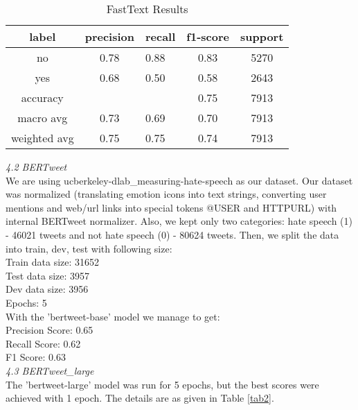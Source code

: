 \documentclass[a4paper, 10pt, conference]{IEEEtran}
\begin{document}
{{{\begin{table}[h!]
\centering
  \caption{FastText Results}
  \label{tab1}
  \setlength{\tabcolsep}{6pt} %
  \renewcommand{\arraystretch}{1.2}%
    \begin{tabular}{c c l c c}
 \hline
    label & precision & recall & f1-score & support \\
    
    \hline
    no  & 0.78  &  0.88 &  0.83 & 5270 \\ %
    yes  & 0.68  &  0.50 &  0.58 & 2643 \\ %
    accuracy   &      &        &  0.75 & 7913 \\ %
    macro avg & 0.73 & 0.69 & 0.70& 7913 \\ %
    weighted avg & 0.75 & 0.75 & 0.74 & 7913 \\ \hline
  \end{tabular}
\end{table}

\noindent\textit{4.2 BERTweet}\\

We are using ucberkeley-dlab\_measuring-hate-speech as our dataset. Our dataset was normalized (translating emotion icons into text strings, converting user mentions and web/url links into special tokens @USER and HTTPURL) with internal BERTweet normalizer. Also, we kept only two categories: hate speech (1) - 46021 tweets and not hate speech (0) - 80624 tweets. Then, we split the data into train, dev, test with following size:\\
Train data size: 31652\\
Test data size: 3957\\
Dev data size: 3956\\
Epochs: 5\\
With the 'bertweet-base' model we manage to get:\\
Precision Score: 0.65\\
Recall Score: 0.62\\
F1 Score: 0.63\\

\noindent\textit{4.3 BERTweet\_large}\\

The 'bertweet-large' model was run for 5 epochs, but the best scores were achieved with 1 epoch. The details are as given in Table \ref{tab2}. \\

}}}
\end{document}
